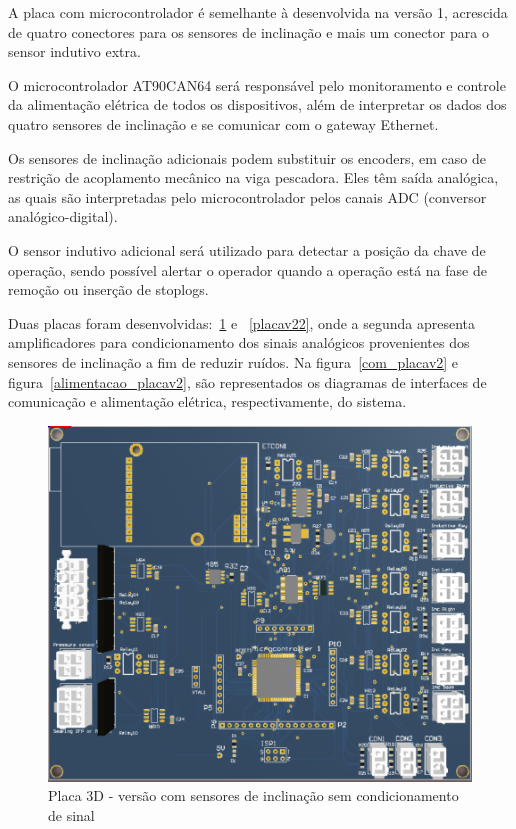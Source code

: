 A placa com microcontrolador é semelhante à desenvolvida na versão 1,
acrescida de quatro conectores para os sensores de inclinação e mais um
conector para o sensor indutivo extra. 

O microcontrolador AT90CAN64 será responsável pelo monitoramento e controle da
alimentação elétrica de todos os dispositivos, além de interpretar os dados dos
quatro sensores de inclinação e se comunicar com o gateway Ethernet. 

Os sensores de inclinação adicionais podem substituir os encoders, em caso de
restrição de acoplamento mecânico na viga pescadora. Eles têm saída
analógica, as quais são interpretadas pelo microcontrolador pelos canais
ADC (conversor analógico-digital).

O sensor indutivo adicional será utilizado para detectar a posição da chave de
operação, sendo possível alertar o operador quando a operação está na fase de
remoção ou inserção de stoplogs.

Duas placas foram desenvolvidas:~\ref{placav21} e ~\ref{placav22}, onde a segunda apresenta
amplificadores para condicionamento dos sinais analógicos provenientes dos
sensores de inclinação a fim de reduzir ruídos. Na figura~\ref{com_placav2} e
figura~\ref{alimentacao_placav2}, são representados os diagramas de interfaces de comunicação e alimentação elétrica,
respectivamente, do sistema.

\begin{figure}[H]
\centering
\includegraphics[width=1\columnwidth]{figs/eletronica/placav21.png}
\caption{Placa 3D - versão com sensores de inclinação sem condicionamento de
sinal}
\label{placav21}
\end{figure}


